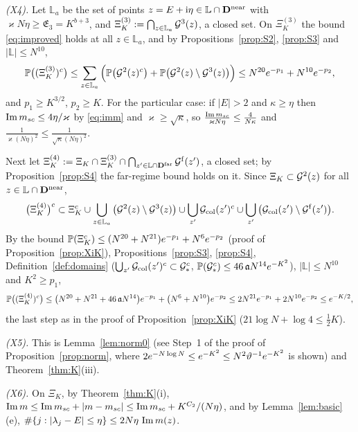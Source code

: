 \emph{\textup{(X4)}.} Let $\mathbb L_a$ be the set of points $z=E+\mathrm{i}\eta\in\mathbb L\cap\mathbf{D}^{\rm near}$ with $\varkappa N\eta\ge\mathfrak E_3=K^{b+3}$, and $\Xi_K^{(3)}:=\bigcap_{z\in\mathbb L_a}\mathcal{G}^3(z)$, a closed set. On $\Xi_K^{(3)}$ the bound \eqref{eq:improved} holds at all $z\in\mathbb L_a$, and by Propositions~\ref{prop:S2}, \ref{prop:S3} and $|\mathbb L|\le N^{10}$,
\[
 \mathbb{P}\big((\Xi_K^{(3)})^c\big)\le\sum_{z\in\mathbb L_a}\Big(\mathbb{P}\big(\mathcal{G}^2(z)^c\big)+\mathbb{P}\big(\mathcal{G}^2(z)\setminus\mathcal{G}^3(z)\big)\Big)\le N^{20}e^{-p_1}+N^{10}e^{-p_2},
\]
and $p_1\ge K^{3/2}$, $p_2\ge K$. For the particular case: if $|E|>2$ and $\kappa\ge\eta$ then $\operatorname{Im}m_{sc}\le4\eta/\varkappa$ by \eqref{eq:imm} and $\varkappa\ge\sqrt\kappa$, so $\frac{\operatorname{Im}m_{sc}}{\varkappa N\eta}\le\frac4{N\kappa}$ and $\frac1{\varkappa(N\eta)^2}\le\frac1{\sqrt\kappa(N\eta)^2}$.

Next let $\Xi_K^{(4)}:=\Xi_K\cap\Xi_K^{(3)}\cap\bigcap_{z'\in\mathbb L\cap\mathbf{D}^{\rm far}}\mathcal{G}^{\rm f}(z')$, a closed set; by Proposition~\ref{prop:S4} the far-regime bound holds on it. Since $\Xi_K\subset\mathcal{G}^2(z)$ for all $z\in\mathbb L\cap\mathbf{D}^{\rm near}$,
\[
 \big(\Xi_K^{(4)}\big)^c\subset\Xi_K^c\cup\bigcup_{z\in\mathbb L_a}\big(\mathcal{G}^2(z)\setminus\mathcal{G}^3(z)\big)\cup\bigcup_{z'}\mathcal{G}_{\rm col}(z')^c\cup\bigcup_{z'}\big(\mathcal{G}_{\rm col}(z')\setminus\mathcal{G}^{\rm f}(z')\big).
\]
By the bound $\mathbb{P}(\Xi_K^c)\le(N^{20}+N^{21})e^{-p_1}+N^6e^{-p_2}$ (proof of Proposition~\ref{prop:XiK}), Propositions~\ref{prop:S3}, \ref{prop:S4}, Definition~\ref{def:domains} ($\bigcup_{z'}\mathcal{G}_{\rm col}(z')^c\subset\mathcal{G}_*^c$, $\mathbb{P}(\mathcal{G}_*^c)\le46\,\mathfrak{a} N^{14}e^{-K^2}$), $|\mathbb L|\le N^{10}$ and $K^2\ge p_1$,
\[
 \mathbb{P}\big((\Xi_K^{(4)})^c\big)\le\big(N^{20}+N^{21}+46\,\mathfrak{a} N^{14}\big)e^{-p_1}+\big(N^6+N^{10}\big)e^{-p_2}\le2N^{21}e^{-p_1}+2N^{10}e^{-p_2}\le e^{-K/2},
\]
the last step as in the proof of Proposition~\ref{prop:XiK} ($21\log N+\log4\le\frac12K$).

\emph{\textup{(X5)}.} This is Lemma~\ref{lem:norm0} (see Step~1 of the proof of Proposition~\ref{prop:norm}, where $2e^{-N\log N}\le e^{-K^2}\le N^2\vartheta^{-1}e^{-K^2}$ is shown) and Theorem~\ref{thm:K}(iii).

\emph{\textup{(X6)}.} On $\Xi_K$, by Theorem~\ref{thm:K}(i), $\operatorname{Im} m\le\operatorname{Im}m_{sc}+|m-m_{sc}|\le\operatorname{Im}m_{sc}+K^{C_2}/(N\eta)$, and by Lemma~\ref{lem:basic}(e), $\#\{j:|\lambda_j-E|\le\eta\}\le2N\eta\,\operatorname{Im} m(z)$.

